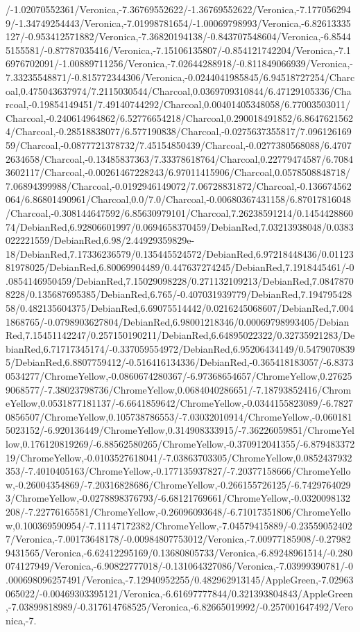 {\begin{tikzternal}
/-1.02070552361/Veronica,-7.36769552622/-1.36769552622/Veronica,-7.1770562949/-1.34749254443/Veronica,-7.01998781654/-1.00069798993/Veronica,-6.82613335127/-0.953412571882/Veronica,-7.36820194138/-0.843707548604/Veronica,-6.85445155581/-0.87787035416/Veronica,-7.15106135807/-0.854121742204/Veronica,-7.16976702091/-1.00889711256/Veronica,-7.02644288918/-0.811849066939/Veronica,-7.33235548871/-0.815772344306/Veronica,-0.0244041985845/6.94518727254/Charcoal,0.475043637974/7.2115030544/Charcoal,0.0369709310844/6.47129105336/Charcoal,-0.19854149451/7.49140744292/Charcoal,0.00401405348058/6.77003503011/Charcoal,-0.240614964862/6.52776654218/Charcoal,0.290018491852/6.86476215624/Charcoal,-0.28518838077/6.577190838/Charcoal,-0.0275637355817/7.09612616959/Charcoal,-0.0877721378732/7.45154850439/Charcoal,-0.0277380568088/6.47072634658/Charcoal,-0.13485837363/7.33378618764/Charcoal,0.22779474587/6.70843602117/Charcoal,-0.00261467228243/6.97011415906/Charcoal,0.0578508848718/7.06894399988/Charcoal,-0.0192946149072/7.06728831872/Charcoal,-0.136674562064/6.86801490961/Charcoal,0.0/7.0/Charcoal,-0.00680367431158/6.87017816048/Charcoal,-0.308144647592/6.85630979101/Charcoal,7.26238591214/0.145442886074/DebianRed,6.92806601997/0.0694658370459/DebianRed,7.03213938048/0.0383022221559/DebianRed,6.98/2.44929359829e-18/DebianRed,7.17336236579/0.135445524572/DebianRed,6.97218448436/0.0112381978025/DebianRed,6.80069904489/0.447637274245/DebianRed,7.1918445461/-0.0854146950459/DebianRed,7.15029098228/0.271132109213/DebianRed,7.08478708228/0.135687695385/DebianRed,6.765/-0.407031939779/DebianRed,7.19479542858/0.482135604375/DebianRed,6.69075514442/0.0216245068607/DebianRed,7.0041868765/-0.0798903627804/DebianRed,6.98001218346/0.00069798993405/DebianRed,7.15451142247/0.257150190211/DebianRed,6.64895022322/0.32735921283/DebianRed,6.71717345174/-0.337059554972/DebianRed,6.95206434149/0.54790708395/DebianRed,6.8807759412/-0.516416134336/DebianRed,-0.365418183057/-6.83730534277/ChromeYellow,-0.0860674280367/-6.97368654657/ChromeYellow,0.276259068577/-7.38023798736/ChromeYellow,0.0684040286651/-7.18793852416/ChromeYellow,0.0531877181137/-6.6641859642/ChromeYellow,-0.0344155823089/-6.78270856507/ChromeYellow,0.105738786553/-7.03032010914/ChromeYellow,-0.0601815023152/-6.920136449/ChromeYellow,0.314908333915/-7.36226059851/ChromeYellow,0.176120819269/-6.88562580265/ChromeYellow,-0.370912041355/-6.87948337219/ChromeYellow,-0.0103527618041/-7.03863703305/ChromeYellow,0.0852437932353/-7.4010405163/ChromeYellow,-0.177135937827/-7.20377158666/ChromeYellow,-0.26004354869/-7.20316828686/ChromeYellow,-0.266155726125/-6.74297640293/ChromeYellow,-0.0278898376793/-6.68121769661/ChromeYellow,-0.0320098132208/-7.22776165581/ChromeYellow,-0.26096093648/-6.71017351806/ChromeYellow,0.100369590954/-7.11147172382/ChromeYellow,-7.04579415889/-0.235590524027/Veronica,-7.00173648178/-0.00984807753012/Veronica,-7.00977185908/-0.279829431565/Veronica,-6.62412295169/0.13680805733/Veronica,-6.89248961514/-0.280074127949/Veronica,-6.90822777018/-0.131064327086/Veronica,-7.03999390781/-0.000698096257491/Veronica,-7.12940952255/0.482962913145/AppleGreen,-7.02963065022/-0.00469303395121/Veronica,-6.61697777844/0.321393804843/AppleGreen,-7.03899818989/-0.317614768525/Veronica,-6.82665019992/-0.257001647492/Veronica,-7.
\end{tikzternal}}

